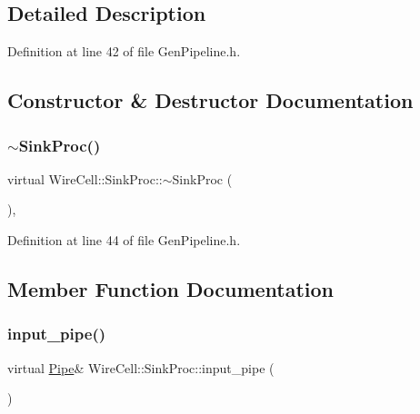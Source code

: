 \subsection{Detailed Description}


Definition at line 42 of file Gen\+Pipeline.\+h.



\subsection{Constructor \& Destructor Documentation}
\mbox{\label{class_wire_cell_1_1_sink_proc_a8fa90973d4a178be7ce257b6c13c6e1c}} 
\subsubsection{\texorpdfstring{$\sim$\+Sink\+Proc()}{~SinkProc()}}
{\footnotesize\ttfamily virtual Wire\+Cell\+::\+Sink\+Proc\+::$\sim$\+Sink\+Proc (\begin{DoxyParamCaption}{ }\end{DoxyParamCaption})\hspace{0.3cm}{\ttfamily [inline]}, {\ttfamily [virtual]}}



Definition at line 44 of file Gen\+Pipeline.\+h.



\subsection{Member Function Documentation}
\mbox{\label{class_wire_cell_1_1_sink_proc_a47ec8c790457ad63e9d0bb9b1b7da935}} 
\subsubsection{\texorpdfstring{input\+\_\+pipe()}{input\_pipe()}}
{\footnotesize\ttfamily virtual \hyperlink{namespace_wire_cell_afce9bb01c731347c3d4c8ca9d4ed804f}{Pipe}\& Wire\+Cell\+::\+Sink\+Proc\+::input\+\_\+pipe (\begin{DoxyParamCaption}{ }\end{DoxyParamCaption})\hspace{0.3cm}{\ttfamily [pure virtual]}}



